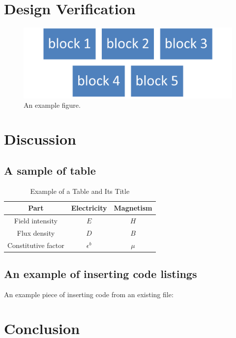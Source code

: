 \documentclass{senior-design}
\begin{document}
\chapter{Design Verification}
\begin{figure}[H]
    \centering
    \includegraphics[width=0.8\linewidth]{figs/Picture1.png}
    \caption{An example figure.}
\end{figure}

\chapter{Discussion}

\section{A sample of table}
\begin{table}[H]
    \centering
    \caption{Example of a Table and Its Title}
    \label{tab:eg-table}
    \begin{tabular}{@{}c|cc@{}}
        \toprule
        Part                & Electricity  & Magnetism \\ \midrule
        Field intensity     & $E$          & $H$       \\
        Flux density        & $D$          & $B$       \\
        Constitutive factor & $\epsilon^b$ & $\mu$     \\ \bottomrule
    \end{tabular}
\end{table}

\section{An example of inserting code listings}
An example piece of inserting code from an existing file:


\chapter{Conclusion}
\end{document}
